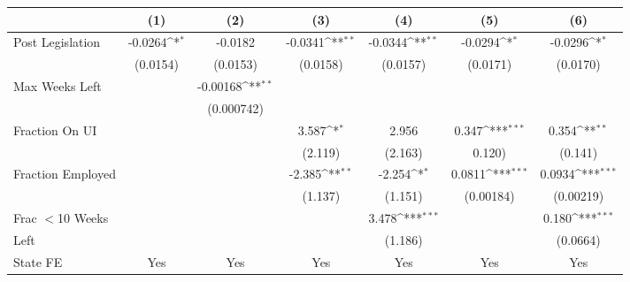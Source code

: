 {
\def\sym#1{\ifmmode^{#1}\else\(^{#1}\)\fi}
\begin{tabular}{l*{6}{c}}
\hline\hline
                    &\multicolumn{1}{c}{(1)}         &\multicolumn{1}{c}{(2)}         &\multicolumn{1}{c}{(3)}         &\multicolumn{1}{c}{(4)}         &\multicolumn{1}{c}{(5)}         &\multicolumn{1}{c}{(6)}         \\
\hline
Post Legislation    &     -0.0264\sym{*}  &     -0.0182         &     -0.0341\sym{**} &     -0.0344\sym{**} &        -0.0294\sym{*}  &     -0.0296\sym{*}   \\
                    &    (0.0154)         &    (0.0153)         &    (0.0158)         &    (0.0157)         &       (0.0171)         &    (0.0170)          \\
[1em]
Max Weeks Left      &                     &    -0.00168\sym{**} &                     &                     &                     &                     \\
                    &                     &  (0.000742)         &                     &                     &                     &                     \\
[1em]
Fraction On UI      &                     &                     &       3.587\sym{*}  &       2.956         &        0.347\sym{***}&       0.354\sym{**}    \\
                    &                     &                     &     (2.119)         &     (2.163)         &       0.120)         &     (0.141)            \\
[1em]
Fraction Employed   &                     &                     &      -2.385\sym{**} &      -2.254\sym{*}  &           0.0811\sym{***}&      0.0934\sym{***}   \\
                    &                     &                     &     (1.137)         &     (1.151)         &        (0.00184)         &   (0.00219)            \\
[1em]
Frac $<$10 Weeks    &                     &                     &                     &       3.478\sym{***}&                     &       0.180\sym{***}  \\
Left                &                     &                     &                     &     (1.186)         &                     &    (0.0664)           \\
\hline
State FE            &         Yes         &         Yes         &         Yes         &         Yes         &         Yes         &         Yes         \\

\end{tabular}}
